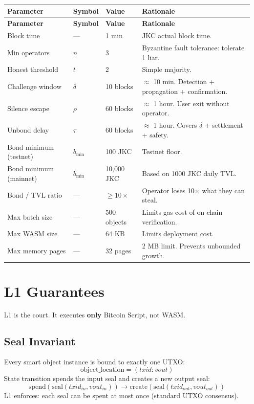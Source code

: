 \documentclass[a4paper,11pt]{article}
\begin{document}
\begin{longtable}{llll}
\toprule
\textbf{Parameter} & \textbf{Symbol} & \textbf{Value} & \textbf{Rationale} \\
\midrule
\endfirsthead
\toprule
\textbf{Parameter} & \textbf{Symbol} & \textbf{Value} & \textbf{Rationale} \\
\midrule
\endhead
Block time & --- & 1 min & JKC actual block time. \\
Min operators & $n$ & 3 & Byzantine fault tolerance: tolerate 1 liar. \\
Honest threshold & $t$ & 2 & Simple majority. \\
Challenge window & $\delta$ & 10 blocks & $\approx$ 10 min. Detection + propagation + confirmation. \\
Silence escape & $\rho$ & 60 blocks & $\approx$ 1 hour. User exit without operator. \\
Unbond delay & $\tau$ & 60 blocks & $\approx$ 1 hour. Covers $\delta$ + settlement + safety. \\
Bond minimum (testnet) & $b_{\min}$ & 100 JKC & Testnet floor. \\
Bond minimum (mainnet) & $b_{\min}$ & 10,000 JKC & Based on 1000 JKC daily TVL. \\
Bond / TVL ratio & --- & $\geq 10\times$ & Operator loses 10$\times$ what they can steal. \\
Max batch size & --- & 500 objects & Limits gas cost of on-chain verification. \\
Max WASM size & --- & 64 KB & Limits deployment cost. \\
Max memory pages & --- & 32 pages & 2 MB limit. Prevents unbounded growth. \\
\bottomrule
\end{longtable}

\section{L1 Guarantees}

L1 is the court. It executes \textbf{only} Bitcoin Script, not WASM.

\subsection{Seal Invariant}

Every smart object instance is bound to exactly one UTXO:
\[
    \text{object\_location} = (txid:vout)
\]
State transition spends the input seal and creates a new output seal:
\[
    \text{spend}(\text{seal}(txid_{in}, vout_{in})) \rightarrow \text{create}(\text{seal}(txid_{out}, vout_{out}))
\]
L1 enforces: each seal can be spent at most once (standard UTXO consensus).
\end{document}
